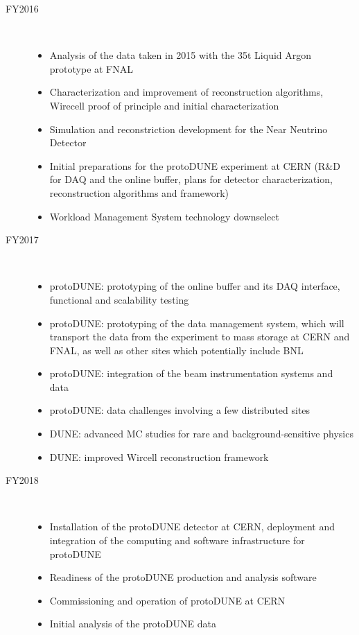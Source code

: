 \documentclass[pdftex,12pt,letter]{article}
\begin{document}
\begin{description}
\item[FY2016] \
\begin{itemize}
\item Analysis of the data taken in 2015 with the 35t Liquid Argon prototype at FNAL
\item Characterization and improvement of reconstruction algorithms, Wirecell proof of principle and initial characterization
\item Simulation and reconstriction development for the Near Neutrino Detector
\item Initial preparations for the protoDUNE experiment at CERN (R\&D for DAQ and the online buffer, plans for detector characterization, reconstruction algorithms and framework)
\item Workload Management System technology downselect
\end{itemize}
\item[FY2017] \
\begin{itemize}
\item protoDUNE: prototyping of the online buffer and its DAQ interface, functional and scalability testing
\item protoDUNE: prototyping of the data management system, which will transport the data from the experiment to mass storage at CERN and FNAL, as well as other sites which potentially include BNL
\item protoDUNE: integration of the beam instrumentation systems and data
\item protoDUNE: data challenges involving a few distributed sites
\item DUNE: advanced MC studies for rare and background-sensitive physics
\item DUNE: improved Wircell reconstruction framework
\end{itemize}

\item[FY2018] \
\begin{itemize}
\item Installation of the protoDUNE detector at CERN, deployment and integration of the computing and software infrastructure for protoDUNE
\item Readiness of the protoDUNE production and analysis software
\item Commissioning and operation of protoDUNE at CERN
\item Initial analysis of the protoDUNE data
\end{itemize}


\end{description}
\end{document}
